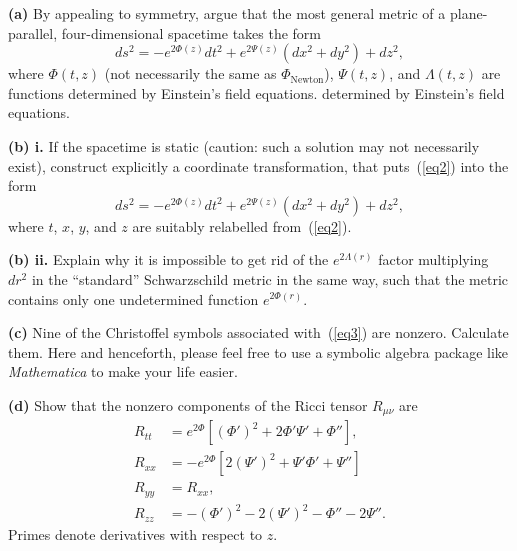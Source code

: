 \documentclass[a4paper]{article} %
\begin{document}
\begin{framed}
\textbf{(a)} By appealing to symmetry, argue that the most general metric of a plane-parallel, four-dimensional spacetime takes the form 
\begin{equation}
ds^2=-e^{2\Phi (z)}dt^2 + e^{2\Psi (z)}(dx^2+dy^2)+dz^2,\label{eq2}
\end{equation}
where $\Phi(t,z)$ (not necessarily the same as $\Phi_{\text{Newton}}$), $\Psi(t,z)$, and $\Lambda(t,z)$ are functions determined by Einstein's field equations.
determined by Einstein’s field equations.
\end{framed}

\begin{framed}
\textbf{(b) i.} If the spacetime is static (caution: such a solution may not necessarily exist), construct explicitly a coordinate transformation, that puts~(\ref{eq2}) into the form 
\begin{equation}
ds^2=-e^{2\Phi(z)} dt^2+e^{2\Psi(z)}(dx^2+dy^2)+dz^2,\label{eq3}
\end{equation}
where $t$, $x$, $y$, and $z$ are suitably relabelled from~(\ref{eq2}).
\end{framed}

\begin{framed}
\textbf{(b) ii.} Explain why it is impossible to get rid of the $e^{2\Lambda(r)}$ factor multiplying $dr^2$ in the ``standard'' Schwarzschild metric in the same way, such that the metric contains only one undetermined function $e^{2\Phi(r)}$.
\end{framed}

\begin{framed}
\textbf{(c)} Nine of the Christoffel symbols associated with~(\ref{eq3}) are nonzero. Calculate them. Here and henceforth, please feel free to use a symbolic algebra package like \emph{Mathematica} to make your life easier.
\end{framed}

\begin{framed}
\textbf{(d)} Show that the nonzero components of the Ricci tensor $R_{\mu\nu}$ are
\begin{align}
R_{tt}&=e^{2\Phi}[(\Phi')^2+2\Phi' \Psi' +\Phi''],\\
R_{xx}&=-e^{2\Phi}[2(\Psi')^2+\Psi' \Phi' + \Psi'']\\
R_{yy}&=R_{xx},\\
R_{zz}&=-(\Phi')^2-2(\Psi')^2-\Phi''-2\Psi''.
\end{align}
Primes denote derivatives with respect to $z$.
\end{framed}
\end{document}
